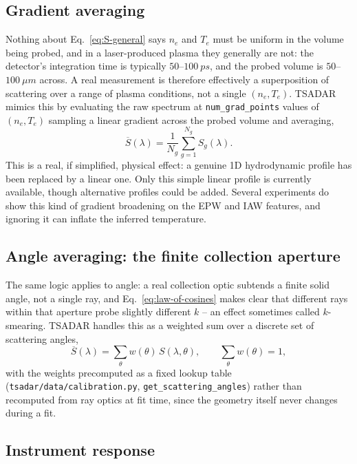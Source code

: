 \documentclass[11pt]{article}
\newcommand{\code}[1]{\texttt{#1}}
\newcommand{\file}[1]{\texttt{#1}}
\begin{document}
\subsection{Gradient averaging}

Nothing about Eq.~\ref{eq:S-general} says $n_e$ and $T_e$ must be uniform in the volume
being probed, and in a laser-produced plasma they generally are not: the detector's
integration time is typically $50$--$100\ \si{ps}$, and the probed volume is
$50$--$100\ \si{\mu m}$ across. A real measurement is therefore effectively a superposition
of scattering over a range of plasma conditions, not a single $(n_e,T_e)$. TSADAR mimics
this by evaluating the raw spectrum at \code{num\_grad\_points} values of $(n_e,T_e)$
sampling a linear gradient across the probed volume and averaging,
\begin{equation}
  \overline S(\lambda) = \frac1{N_g}\sum_{g=1}^{N_g}S_g(\lambda).
\end{equation}
This is a real, if simplified, physical effect: a genuine 1D hydrodynamic profile has been
replaced by a linear one. Only this simple linear profile is currently available, though
alternative profiles could be added. Several experiments do show this kind of gradient
broadening on the EPW and IAW features, and ignoring it can inflate the inferred
temperature.

\subsection{Angle averaging: the finite collection aperture}

The same logic applies to angle: a real collection optic subtends a finite solid angle, not
a single ray, and Eq.~\ref{eq:law-of-cosines} makes clear that different rays within that
aperture probe slightly different $k$ -- an effect sometimes called $k$-smearing. TSADAR
handles this as a weighted sum over a discrete set of scattering angles,
\begin{equation}
  \overline S(\lambda) = \sum_\theta w(\theta)\,S(\lambda,\theta), \qquad \sum_\theta w(\theta)=1,
\end{equation}
with the weights precomputed as a fixed lookup table
(\file{tsadar/data/calibration.py}, \code{get\_scattering\_angles}) rather than recomputed
from ray optics at fit time, since the geometry itself never changes during a fit.

\subsection{Instrument response}\label{sec:irf}
\end{document}
